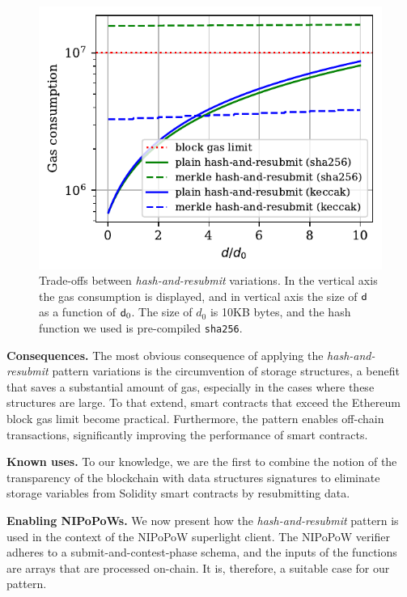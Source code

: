 \begin{figure}[h]
    \begin{center}
        \includegraphics[width=1\columnwidth]{figures/har-vs-mhar.pdf}
    \end{center}
    \caption{Trade-offs between \emph{hash-and-resubmit} variations. In the
    vertical axis the gas consumption is displayed, and in vertical axis the
    size of $\mathsf{d}$ as a function of $\mathsf{d}_0$. The size of $d_0$ is 10KB
    bytes, and the hash function we used is pre-compiled \texttt{sha256}.}
    \label{fig:har-vs-mhar}
\end{figure}

\noindent \textbf{Consequences.} The most obvious consequence of applying the
\emph{hash-and-resubmit} pattern variations is the circumvention of storage
structures, a benefit that saves a substantial amount of gas, especially in the
cases where these structures are large. To that extend, smart contracts that
exceed the Ethereum block gas limit become practical. Furthermore, the pattern
enables off-chain transactions, significantly improving the performance of
smart contracts.

\noindent \textbf{Known uses.} To our knowledge, we are the first to combine
the notion of the transparency of the blockchain with data structures
signatures to eliminate storage variables from Solidity smart contracts by
resubmitting data.

\noindent \textbf{Enabling NIPoPoWs.} We now present how the
\emph{hash-and-resubmit} pattern is used in the context of the NIPoPoW
superlight client. The NIPoPoW verifier adheres to a submit-and-contest-phase
schema, and the inputs of the functions are arrays that are processed on-chain.
It is, therefore, a suitable case for our pattern.

